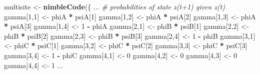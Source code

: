\documentclass[
  12pt,
]{krantz}
\newenvironment{Shaded}{\begin{snugshade}}{\end{snugshade}}
\newcommand{\CommentTok}[1]{\textcolor[rgb]{0.56,0.35,0.01}{\textit{#1}}}
\newcommand{\DecValTok}[1]{\textcolor[rgb]{0.00,0.00,0.81}{#1}}
\newcommand{\FunctionTok}[1]{\textcolor[rgb]{0.13,0.29,0.53}{\textbf{#1}}}
\newcommand{\NormalTok}[1]{#1}
\newcommand{\OtherTok}[1]{\textcolor[rgb]{0.56,0.35,0.01}{#1}}
\newcommand{\SpecialCharTok}[1]{\textcolor[rgb]{0.81,0.36,0.00}{\textbf{#1}}}
\begin{document}
\begin{Shaded}
\begin{Highlighting}[]
\NormalTok{multisite }\OtherTok{\textless{}{-}} \FunctionTok{nimbleCode}\NormalTok{(\{}
\NormalTok{...}
  \CommentTok{\# probabilities of state z(t+1) given z(t)}
\NormalTok{  gamma[}\DecValTok{1}\NormalTok{,}\DecValTok{1}\NormalTok{] }\OtherTok{\textless{}{-}}\NormalTok{ phiA }\SpecialCharTok{*}\NormalTok{ psiA[}\DecValTok{1}\NormalTok{]}
\NormalTok{  gamma[}\DecValTok{1}\NormalTok{,}\DecValTok{2}\NormalTok{] }\OtherTok{\textless{}{-}}\NormalTok{ phiA }\SpecialCharTok{*}\NormalTok{ psiA[}\DecValTok{2}\NormalTok{]}
\NormalTok{  gamma[}\DecValTok{1}\NormalTok{,}\DecValTok{3}\NormalTok{] }\OtherTok{\textless{}{-}}\NormalTok{ phiA }\SpecialCharTok{*}\NormalTok{ psiA[}\DecValTok{3}\NormalTok{]}
\NormalTok{  gamma[}\DecValTok{1}\NormalTok{,}\DecValTok{4}\NormalTok{] }\OtherTok{\textless{}{-}} \DecValTok{1} \SpecialCharTok{{-}}\NormalTok{ phiA}
\NormalTok{  gamma[}\DecValTok{2}\NormalTok{,}\DecValTok{1}\NormalTok{] }\OtherTok{\textless{}{-}}\NormalTok{ phiB }\SpecialCharTok{*}\NormalTok{ psiB[}\DecValTok{1}\NormalTok{]}
\NormalTok{  gamma[}\DecValTok{2}\NormalTok{,}\DecValTok{2}\NormalTok{] }\OtherTok{\textless{}{-}}\NormalTok{ phiB }\SpecialCharTok{*}\NormalTok{ psiB[}\DecValTok{2}\NormalTok{]}
\NormalTok{  gamma[}\DecValTok{2}\NormalTok{,}\DecValTok{3}\NormalTok{] }\OtherTok{\textless{}{-}}\NormalTok{ phiB }\SpecialCharTok{*}\NormalTok{ psiB[}\DecValTok{3}\NormalTok{]}
\NormalTok{  gamma[}\DecValTok{2}\NormalTok{,}\DecValTok{4}\NormalTok{] }\OtherTok{\textless{}{-}} \DecValTok{1} \SpecialCharTok{{-}}\NormalTok{ phiB}
\NormalTok{  gamma[}\DecValTok{3}\NormalTok{,}\DecValTok{1}\NormalTok{] }\OtherTok{\textless{}{-}}\NormalTok{ phiC }\SpecialCharTok{*}\NormalTok{ psiC[}\DecValTok{1}\NormalTok{]}
\NormalTok{  gamma[}\DecValTok{3}\NormalTok{,}\DecValTok{2}\NormalTok{] }\OtherTok{\textless{}{-}}\NormalTok{ phiC }\SpecialCharTok{*}\NormalTok{ psiC[}\DecValTok{2}\NormalTok{]}
\NormalTok{  gamma[}\DecValTok{3}\NormalTok{,}\DecValTok{3}\NormalTok{] }\OtherTok{\textless{}{-}}\NormalTok{ phiC }\SpecialCharTok{*}\NormalTok{ psiC[}\DecValTok{3}\NormalTok{]}
\NormalTok{  gamma[}\DecValTok{3}\NormalTok{,}\DecValTok{4}\NormalTok{] }\OtherTok{\textless{}{-}} \DecValTok{1} \SpecialCharTok{{-}}\NormalTok{ phiC}
\NormalTok{  gamma[}\DecValTok{4}\NormalTok{,}\DecValTok{1}\NormalTok{] }\OtherTok{\textless{}{-}} \DecValTok{0}
\NormalTok{  gamma[}\DecValTok{4}\NormalTok{,}\DecValTok{2}\NormalTok{] }\OtherTok{\textless{}{-}} \DecValTok{0}
\NormalTok{  gamma[}\DecValTok{4}\NormalTok{,}\DecValTok{3}\NormalTok{] }\OtherTok{\textless{}{-}} \DecValTok{0}
\NormalTok{  gamma[}\DecValTok{4}\NormalTok{,}\DecValTok{4}\NormalTok{] }\OtherTok{\textless{}{-}} \DecValTok{1}
\NormalTok{...}
\end{Highlighting}
\end{Shaded}
\end{document}
